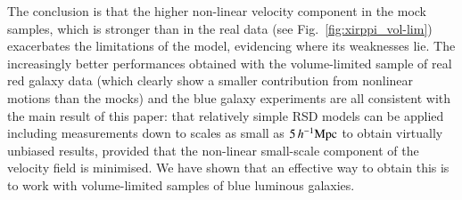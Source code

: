 \documentclass[longauth]{aa}
\def\mhmpc{\,h^{-1}{\rm Mpc}}
\begin{document}
The conclusion is that the higher non-linear velocity component in the mock samples, which is stronger than in the real data (see Fig.~\ref{fig:xirppi_vol-lim}) exacerbates the limitations of the model, evidencing where its weaknesses lie.  The increasingly better performances obtained with the volume-limited sample of real red galaxy data (which clearly show a smaller contribution from nonlinear motions than the mocks) and the blue galaxy experiments are all consistent with the main result of this paper:  that relatively simple RSD models can be applied including measurements down to scales as small as $5\mhmpc$ to obtain virtually unbiased results, provided that the non-linear small-scale component of the velocity field is minimised.  We have shown that an effective way to obtain this is to work with volume-limited samples of blue luminous galaxies.
\end{document}
